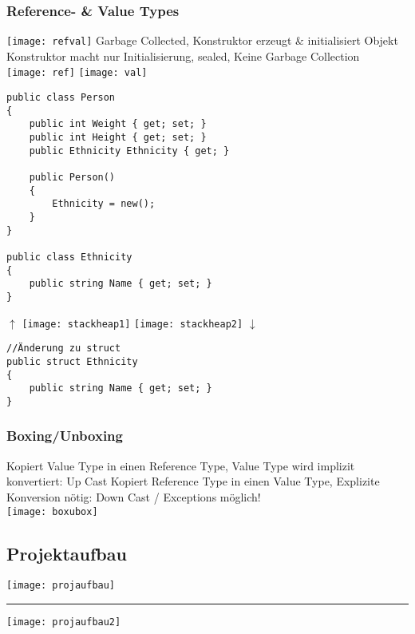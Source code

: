 \begin{multicols*}{2}
\subsubsection{Reference- \& Value Types}
\texttt{[image: refval]}
 Garbage Collected, Konstruktor erzeugt \& initialisiert Objekt
 Konstruktor macht nur Initialisierung, sealed, Keine Garbage Collection
\\\texttt{[image: ref]}
\vrule
\texttt{[image: val]}
\begin{lstlisting}
public class Person
{
    public int Weight { get; set; }
    public int Height { get; set; }
    public Ethnicity Ethnicity { get; }

    public Person()
    {
        Ethnicity = new();
    }
}

public class Ethnicity
{
    public string Name { get; set; }
}
\end{lstlisting}
\begin{multicols*}{2}
$\uparrow$
\texttt{[image: stackheap1]}
\texttt{[image: stackheap2]}
\vfill
$\downarrow$
\end{multicols*}
\begin{lstlisting}
//Änderung zu struct
public struct Ethnicity
{
    public string Name { get; set; }
}
\end{lstlisting}
\subsubsection{Boxing/Unboxing}
 Kopiert Value Type in einen Reference Type, Value Type wird implizit konvertiert: Up Cast
 Kopiert Reference Type in einen Value Type, Explizite Konversion nötig: Down Cast / Exceptions möglich!
\\\texttt{[image: boxubox]}

\subsection{Projektaufbau}
\texttt{[image: projaufbau]}
\hrule
\vspace{2mm}
\texttt{[image: projaufbau2]}

\end{multicols*}
